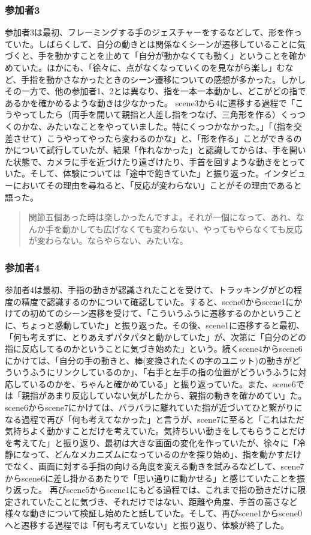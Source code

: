 \subsubsection*{参加者3}
参加者3は最初、フレーミングする手のジェスチャーをするなどして、形を作っていた。しばらくして、自分の動きとは関係なくシーンが遷移していることに気づくと、手を動かすことを止めて「自分が動かなくても動く」ということを確かめていた。ほかにも、「徐々に、点がなくなっていくのを見ながら楽し」むなど、手指を動かさなかったときのシーン遷移についての感想が多かった。しかしその一方で、他の参加者1、2とは異なり、指を一本一本動かし、どこがどの指であるかを確かめるような動きは少なかった。
scene3から4に遷移する過程で「こうやってしたら（両手を開いて親指と人差し指をつなげ、三角形を作る）くっつくのかな、みたいなことをやっていました。特にくっつかなかった。」「（指を交差させて）こうやってやったら変わるのかな」と、「形を作る」ことができるのかについて試行していたが、結果「作れなかった」と認識してからは、手を開いた状態で、カメラに手を近づけたり遠ざけたり、手首を回すような動きをとっていた。そして、体験については「途中で飽きていた」と振り返った。インタビューにおいてその理由を尋ねると、「反応が変わらない」ことがその理由であると語った。
\begin{quote}
  関節五個あった時は楽しかったんですよ。それが一個になって、あれ、なんか手を動かしても広げなくても変わらない、やってもやらなくても反応が変わらない。ならやらない、みたいな。  
\end{quote}

\subsubsection*{参加者4}
参加者4は最初、手指の動きが認識されたことを受けて、トラッキングがどの程度の精度で認識するのかについて確認していた。すると、scene0からscene1にかけての初めてのシーン遷移を受けて、「こういうふうに遷移するのかということに、ちょっと感動していた」と振り返った。その後、scene1に遷移すると最初、「何も考えずに、とりあえずパタパタと動かしていた」が、次第に「自分のどの指に反応してるのかということに気づき始めた」という。続くscene4からscene6にかけては、「自分の手の動きと、棒(変換されたくの字のユニット)の動きがどういうふうにリンクしているのか」、「右手と左手の指の位置がどういうふうに対応しているのかを、ちゃんと確かめている」と振り返っていた。また、scene6では「親指があまり反応していない気がしたから、親指の動きを確かめてい」た。scene6からscene7にかけては、バラバラに離れていた指が近づいてひと繋がりになる過程で再び「何も考えてなかった」と言うが、scene7に至ると「これはただ気持ちよく動かすことだけを考えていた。気持ちいい動きをしてもらうことだけを考えてた」と振り返り、最初は大きな画面の変化を作っていたが、徐々に「冷静になって、どんなメカニズムになっているのかを探り始め」、指を動かすだけでなく、画面に対する手指の向ける角度を変える動きを試みるなどして、scene7からscene6に差し掛かるあたりで「思い通りに動かせる」と感じていたことを振り返った。
再びscene5からscene1にもどる過程では、これまで指の動きだけに限定されていたことに気づき、それだけではない、距離や角度、手首の高さなど様々な動きについて検証し始めたと話していた。そして、再びscene1からscene0へと遷移する過程では「何も考えていない」と振り返り、体験が終了した。

